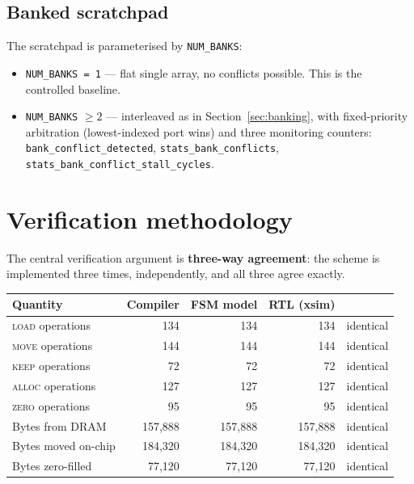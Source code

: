 \documentclass[11pt,a4paper]{article}
\newcommand{\op}[1]{\textsc{#1}}
\begin{document}
\subsection{Banked scratchpad}

The scratchpad is parameterised by \texttt{NUM\_BANKS}:

\begin{itemize}[leftmargin=1.4em,itemsep=2pt]
  \item \texttt{NUM\_BANKS = 1} --- flat single array, no conflicts possible.
        This is the controlled baseline.
  \item \texttt{NUM\_BANKS} $\ge 2$ --- interleaved as in
        Section~\ref{sec:banking}, with fixed-priority arbitration
        (lowest-indexed port wins) and three monitoring counters:
        \texttt{bank\_conflict\_detected}, \texttt{stats\_bank\_conflicts},
        \texttt{stats\_bank\_conflict\_stall\_cycles}.
\end{itemize}

\section{Verification methodology}

The central verification argument is \textbf{three-way agreement}: the scheme
is implemented three times, independently, and all three agree exactly.

\begin{center}
\small
\begin{tabular}{@{}lrrrl@{}}
\toprule
\textbf{Quantity} & \textbf{Compiler} & \textbf{FSM model} & \textbf{RTL (xsim)} & \\
\midrule
\op{load} operations & 134 & 134 & 134 & identical \\
\op{move} operations & 144 & 144 & 144 & identical \\
\op{keep} operations & 72 & 72 & 72 & identical \\
\op{alloc} operations & 127 & 127 & 127 & identical \\
\op{zero} operations & 95 & 95 & 95 & identical \\
Bytes from DRAM & 157{,}888 & 157{,}888 & 157{,}888 & identical \\
Bytes moved on-chip & 184{,}320 & 184{,}320 & 184{,}320 & identical \\
Bytes zero-filled & 77{,}120 & 77{,}120 & 77{,}120 & identical \\
\bottomrule
\end{tabular}
\end{center}
\end{document}
